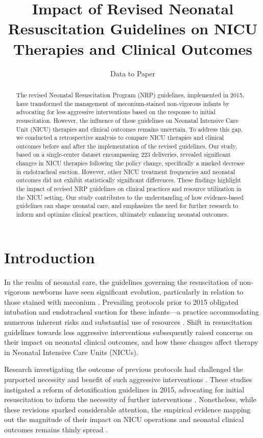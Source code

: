 \documentclass[11pt]{article}
\title{Impact of Revised Neonatal Resuscitation Guidelines on NICU Therapies and Clinical Outcomes}
\author{Data to Paper}
\begin{document}
\maketitle
\begin{abstract}The revised Neonatal Resuscitation Program (NRP) guidelines, implemented in 2015, have transformed the management of meconium-stained non-vigorous infants by advocating for less aggressive interventions based on the response to initial resuscitation. However, the influence of these guidelines on Neonatal Intensive Care Unit (NICU) therapies and clinical outcomes remains uncertain. To address this gap, we conducted a retrospective analysis to compare NICU therapies and clinical outcomes before and after the implementation of the revised guidelines. Our study, based on a single-center dataset encompassing 223 deliveries, revealed significant changes in NICU therapies following the policy change, specifically a marked decrease in endotracheal suction. However, other NICU treatment frequencies and neonatal outcomes did not exhibit statistically significant differences. These findings highlight the impact of revised NRP guidelines on clinical practices and resource utilization in the NICU setting. Our study contributes to the understanding of how evidence-based guidelines can shape neonatal care, and emphasizes the need for further research to inform and optimize clinical practices, ultimately enhancing neonatal outcomes.\end{abstract}
\section*{Introduction}

In the realm of neonatal care, the guidelines governing the resuscitation of non-vigorous newborns have seen significant evolution, particularly in relation to those stained with meconium \cite{Carbine2000VideoRA, Wiswell2000DeliveryRM}. Prevailing protocols prior to 2015 obligated intubation and endotracheal suction for these infants—a practice accommodating numerous inherent risks and substantial use of resources \cite{Bhutani2008DevelopingAS}. Shift in resuscitation guidelines towards less aggressive interventions subsequently raised concerns on their impact on neonatal clinical outcomes, and how these changes affect therapy in Neonatal Intensive Care Units (NICUs).

Research investigating the outcome of previous protocols had challenged the purported necessity and benefit of such aggressive interventions \cite{Wiswell2000DeliveryRM}. These studies instigated a reform of detoxification guidelines in 2015, advocating for initial resuscitation to inform the necessity of further interventions \cite{Myers2020ImpactOT}. Nonetheless, while these revisions sparked considerable attention, the empirical evidence mapping out the magnitude of their impact on NICU operations and neonatal clinical outcomes remains thinly spread \cite{Gidaganti2018EffectOG}.
\end{document}
